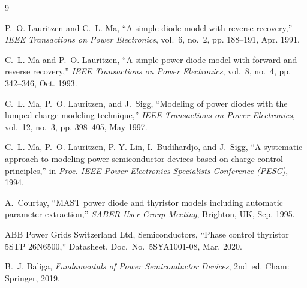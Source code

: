 \documentclass[11pt,a4paper]{article}
\begin{document}
\begin{thebibliography}{9}

P.~O. Lauritzen and C.~L. Ma,
``A simple diode model with reverse recovery,''
\emph{IEEE Transactions on Power Electronics}, vol.~6, no.~2, pp. 188--191,
Apr. 1991.

C.~L. Ma and P.~O. Lauritzen,
``A simple power diode model with forward and reverse recovery,''
\emph{IEEE Transactions on Power Electronics}, vol.~8, no.~4, pp. 342--346,
Oct. 1993.

C.~L. Ma, P.~O. Lauritzen, and J.~Sigg,
``Modeling of power diodes with the lumped-charge modeling technique,''
\emph{IEEE Transactions on Power Electronics}, vol.~12, no.~3, pp. 398--405,
May 1997.

C.~L. Ma, P.~O. Lauritzen, P.-Y. Lin, I.~Budihardjo, and J.~Sigg,
``A systematic approach to modeling power semiconductor devices based on
charge control principles,''
in \emph{Proc. IEEE Power Electronics Specialists Conference (PESC)}, 1994.

A.~Courtay,
``MAST power diode and thyristor models including automatic parameter
extraction,''
\emph{SABER User Group Meeting}, Brighton, UK, Sep. 1995.

ABB Power Grids Switzerland Ltd, Semiconductors,
``Phase control thyristor 5STP 26N6500,''
Datasheet, Doc.\ No.\ 5SYA1001-08, Mar. 2020.

B.~J. Baliga,
\emph{Fundamentals of Power Semiconductor Devices}, 2nd~ed.
Cham: Springer, 2019.

\end{thebibliography}
\end{document}
